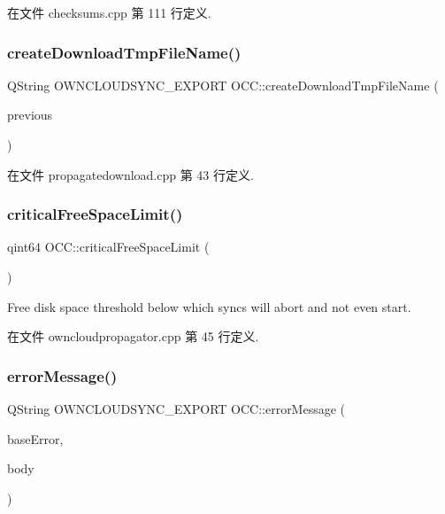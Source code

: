 在文件 checksums.\+cpp 第 111 行定义.

\mbox{\label{namespace_o_c_c_a8f41a179ea2c7464f496e1b8b38285ba}} 
\subsubsection{\texorpdfstring{create\+Download\+Tmp\+File\+Name()}{createDownloadTmpFileName()}}
{\footnotesize\ttfamily Q\+String O\+W\+N\+C\+L\+O\+U\+D\+S\+Y\+N\+C\+\_\+\+E\+X\+P\+O\+RT O\+C\+C\+::create\+Download\+Tmp\+File\+Name (\begin{DoxyParamCaption}\item[{const Q\+String \&}]{previous }\end{DoxyParamCaption})}



在文件 propagatedownload.\+cpp 第 43 行定义.

\mbox{\label{namespace_o_c_c_a445860e1fc706b08d73845acc1dac5dd}} 
\subsubsection{\texorpdfstring{critical\+Free\+Space\+Limit()}{criticalFreeSpaceLimit()}}
{\footnotesize\ttfamily qint64 O\+C\+C\+::critical\+Free\+Space\+Limit (\begin{DoxyParamCaption}{ }\end{DoxyParamCaption})}

Free disk space threshold below which syncs will abort and not even start. 

在文件 owncloudpropagator.\+cpp 第 45 行定义.

\mbox{\label{namespace_o_c_c_a6388eb0c5d2f85e5085e09bf16a93d1b}} 
\subsubsection{\texorpdfstring{error\+Message()}{errorMessage()}}
{\footnotesize\ttfamily Q\+String O\+W\+N\+C\+L\+O\+U\+D\+S\+Y\+N\+C\+\_\+\+E\+X\+P\+O\+RT O\+C\+C\+::error\+Message (\begin{DoxyParamCaption}\item[{const Q\+String \&}]{base\+Error,  }\item[{const Q\+Byte\+Array \&}]{body }\end{DoxyParamCaption})}

